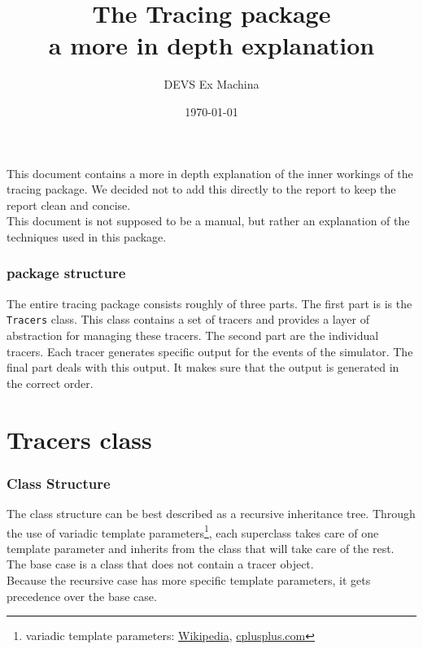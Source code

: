 \documentclass[12pt]{article}
\newcommand{\inlinecpp}[1]{\lstinline[language=c++]{#1}}
\begin{document}
\lstset{language=C++}
\title{The Tracing package\\ \large a more in depth explanation}
\author{DEVS Ex Machina}
\date{\today}


\maketitle
This document contains a more in depth explanation of the inner workings of the tracing package. We decided not to add this directly to the report to keep the report clean and concise.\\
This document is not supposed to be a manual, but rather an explanation of the techniques used in this package.
\section{package structure}
The entire tracing package consists roughly of three parts. The first part is is the \inlinecpp{Tracers} class. This class contains a set of tracers and provides a layer of abstraction for managing these tracers. The second part are the individual tracers. Each tracer generates specific output for the events of the simulator. The final part deals with this output. It makes sure that the output is generated in the correct order.
\part*{Tracers class} 
\section{Class Structure}
The class structure can be best described as a recursive inheritance tree. Through the use of variadic template parameters\footnote{variadic template parameters: \href{http://en.wikipedia.org/wiki/Variadic_template}{Wikipedia}, \href{http://www.cplusplus.com/articles/EhvU7k9E/}{cplusplus.com}}, each superclass takes care of one template parameter and inherits from the class that will take care of the rest.\\
The base case is a class that does not contain a tracer object.\\
Because the recursive case has more specific template parameters, it gets precedence over the base case.
\end{document}
